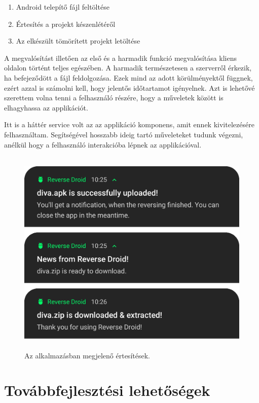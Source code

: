 \documentclass{thesis-ekf}
\theoremstyle{definition}
\theoremstyle{remark}
\begin{document}
\begin{enumerate}
	\item Android telepítő fájl feltöltése
	\item Értesítés a projekt készenlétéről
	\item Az elkészült tömörített projekt letöltése
\end{enumerate}

A megvalósítást illetően az első és a harmadik funkció megvalósítása kliens oldalon történt teljes egészében.
A harmadik természetesen a szerverről érkezik, ha befejeződött a fájl feldolgozása.
Ezek mind az adott körülményektől függnek, ezért azzal is számolni kell, hogy jelentős időtartamot igényelnek.
Azt is lehetővé szerettem volna tenni a felhasználó részére, hogy a műveletek között is elhagyhassa az applikációt.

Itt is a háttér service volt az az applikáció komponens, amit ennek kivitelezésére felhasználtam.
Segítségével hosszabb ideig tartó műveleteket tudunk végezni, anélkül hogy a felhasználó interakcióba lépnek az applikációval.

\begin{figure}[!h]
	\centering
	\includegraphics[height=10cm]{pictures/notifications}
	\caption{Az alkalmazásban megjelenő értesítések.}
	\label{notifications}
\end{figure}

\chapter{Továbbfejlesztési lehetőségek}\label{lehetosegek}
\end{document}
